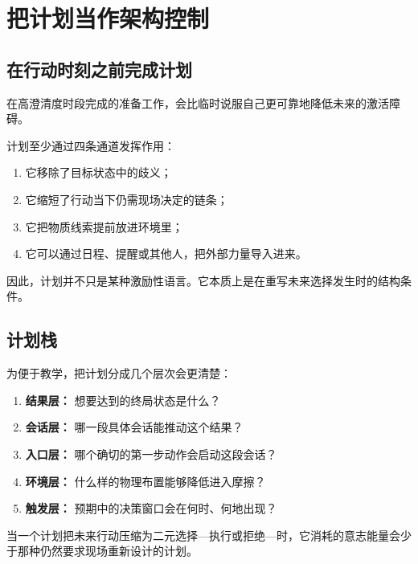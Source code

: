 \chapter{把计划当作架构控制}
\label{ch:planning}

\section{在行动时刻之前完成计划}

\begin{theorem}[计划定理]
在高澄清度时段完成的准备工作，会比临时说服自己更可靠地降低未来的激活障碍。
\end{theorem}

\begin{discussion}
计划至少通过四条通道发挥作用：
\begin{enumerate}[nosep]
  \item 它移除了目标状态中的歧义；
  \item 它缩短了行动当下仍需现场决定的链条；
  \item 它把物质线索提前放进环境里；
  \item 它可以通过日程、提醒或其他人，把外部力量导入进来。
\end{enumerate}
因此，计划并不只是某种激励性语言。它本质上是在重写未来选择发生时的结构条件。
\end{discussion}

\section{计划栈}

为便于教学，把计划分成几个层次会更清楚：
\begin{enumerate}[nosep]
  \item \textbf{结果层：} 想要达到的终局状态是什么？
  \item \textbf{会话层：} 哪一段具体会话能推动这个结果？
  \item \textbf{入口层：} 哪个确切的第一步动作会启动这段会话？
  \item \textbf{环境层：} 什么样的物理布置能够降低进入摩擦？
  \item \textbf{触发层：} 预期中的决策窗口会在何时、何地出现？
\end{enumerate}

\begin{proposition}[二元执行优势]
当一个计划把未来行动压缩为二元选择---执行或拒绝---时，它消耗的意志能量会少于那种仍然要求现场重新设计的计划。
\end{proposition}

